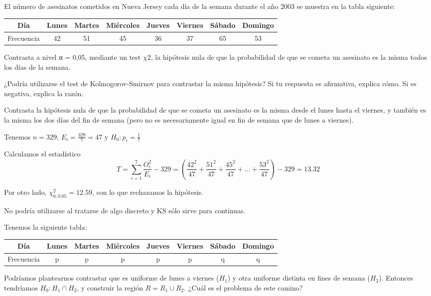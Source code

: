 \begin{problem}[4] El número de asesinatos cometidos en Nueva Jersey cada día de la semana durante el año 2003 se muestra en la tabla siguiente:

\begin{center}
\begin{tabular}{c|ccccccc}
Día & Lunes & Martes & Miércoles & Jueves & Viernes & Sábado & Domingo \\\hline
Frecuencia & 42 & 51 & 45 & 36 & 37 & 65 & 53
\end{tabular}
\end{center}

\ppart Contrasta a nivel α = 0,05, mediante un test $χ2$, la hipótesis nula de que la probabilidad de que se cometa un asesinato es la misma todos los días de la semana.

\ppart ¿Podría utilizarse el test de Kolmogorov-Smirnov para contrastar la misma hipótesis? Si tu
respuesta es afirmativa, explica cómo. Si es negativa, explica la razón.


\ppart Contrasta la hipótesis nula de que la probabilidad de que se cometa un asesinato es la misma desde el lunes hasta el viernes, y también es la misma los dos días del fin de semana (pero no es necesariamente igual en fin de semana que de lunes a viernes).

\solution

\spart Tenemos $n = 329$, $E_i = \frac{329}{7} = 47$ y $H_0 : p_i = \frac{1}{7}$

Calculamos el estadístico \[T = \sum_{i=1}^7 \frac{O_i^2}{E_i} - 329 = \left(\frac{42^2}{47} + \frac{51^2}{47} + \frac{45^2}{47} + ... + \frac{53^2}{47}\right) - 329 = 13.32\]

Por otro lado, $\chi^2_{6;0.05} = 12.59$, con lo que rechazamos la hipótesis.

\spart No podría utilizarse al tratarse de algo discreto y KS sólo sirve para continuas.

\spart

Tenemos la siguiente tabla:

\begin{center}
\begin{tabular}{c|ccccccc}
Día & Lunes & Martes & Miércoles & Jueves & Viernes & Sábado & Domingo \\\hline
Frecuencia & p & p & p & p & p & q & q
\end{tabular}
\end{center}


\obs
Podríamos plantearnos contrastar que es uniforme de lunes a viernes ($H_1$) y otra uniforme distinta en fines de semana ($H_2$). Entonces tendríamos $H_0 : H_1 \cap H_2$, y construir la región $R = R_1 \cup R_2$. ¿Cuál es el problema de este camino?


\end{problem}
